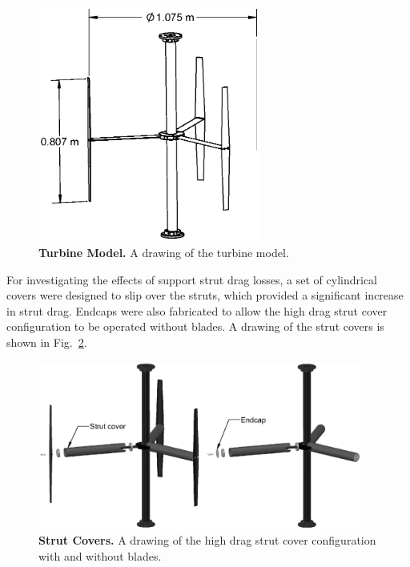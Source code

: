 \documentclass[10pt,letterpaper]{article}
\begin{document}
\begin{figure}[h]
    \includegraphics[width=0.65\textwidth]{figures/turbine.eps}

    \caption{{\bf Turbine Model.} A drawing of the turbine model.}

    \label{fig:turbine-drawing}
\end{figure}

For investigating the effects of support strut drag losses, a set of cylindrical
covers were designed to slip over the struts, which provided a significant
increase in strut drag. Endcaps were also fabricated to allow the high drag
strut cover configuration to be operated without blades. A drawing of the strut
covers is shown in Fig.~\ref{fig:covers}.

\begin{figure}[h]
    \includegraphics[width=0.95\textwidth]{figures/strut_covers.eps}
    
    \caption{{\bf Strut Covers.} A drawing of the high drag strut cover
        configuration with and without blades.}
    
    \label{fig:covers}
\end{figure}
\end{document}
